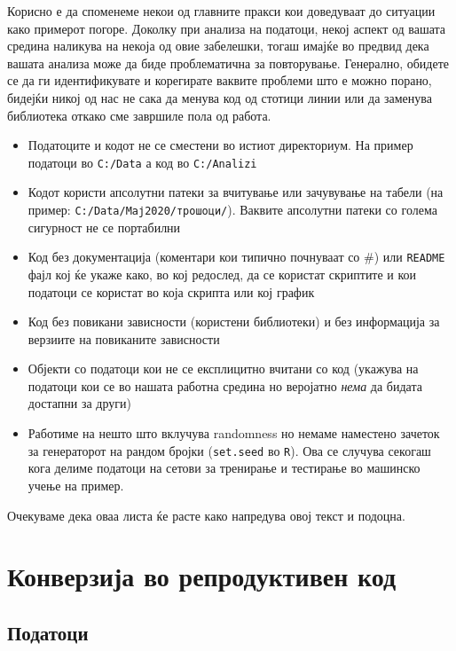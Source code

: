 \documentclass[
]{book}
\begin{document}
Корисно е да споменеме некои од главните пракси кои доведуваат до ситуации како примерот погоре. Доколку при анализа на податоци, некој аспект од вашата средина наликува на некоја од овие забелешки, тогаш имајќе во предвид дека вашата анализа може да биде проблематична за повторување. Генерално, обидете се да ги идентификувате и корегирате ваквите проблеми што е можно порано, бидејќи никој од нас не сака да менува код од стотици линии или да заменува библиотека откако сме завршиле пола од работа.

\begin{itemize}
\item
  Податоците и кодот не се сместени во истиот директориум. На пример податоци во \texttt{C:/Data} а код во \texttt{C:/Analizi}
\item
  Кодот користи апсолутни патеки за вчитување или зачувување на табели (на пример: \texttt{C:/Data/Мај2020/трошоци/}). Ваквите апсолутни патеки со голема сигурност не се портабилни
\item
  Код без документација (коментари кои типично почнуваат со \#) или \texttt{README} фајл кој ќе укаже како, во кој редослед, да се користат скриптите и кои податоци се користат во која скрипта или кој график
\item
  Код без повикани зависности (користени библиотеки) и без информација за верзиите на повиканите зависности
\item
  Објекти со податоци кои не се експлицитно вчитани со код (укажува на податоци кои се во нашата работна средина но веројатно \emph{нема} да бидата достапни за други)
\item
  Работиме на нешто што вклучува randomness но немаме наместено зачеток за генераторот на рандом бројки (\texttt{set.seed} во \texttt{R}). Ова се случува секогаш кога делиме податоци на сетови за тренирање и тестирање во машинско учење на пример.
\end{itemize}

Очекуваме дека оваа листа ќе расте како напредува овој текст и подоцна.

\hypertarget{conversion}{%
\chapter{Конверзија во репродуктивен код}\label{conversion}}

\hypertarget{ux43fux43eux434ux430ux442ux43eux446ux438}{%
\section{Податоци}\label{ux43fux43eux434ux430ux442ux43eux446ux438}}
\end{document}
